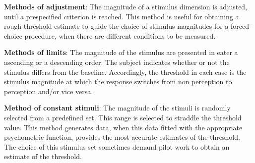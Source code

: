 \textbf{Methods of adjustment}: The magnitude of a stimulus dimension is adjusted, until a prespecified criterion is reached. This method is useful for obtaining a rough threshold estimate to guide the choice of stimulus magnitudes for a forced-choice procedure, when there are different conditions to be measured. \cite{Kingdom2016}

\textbf{Methods of limits}: The magnitude of the stimulus are presented in eater a ascending or a descending order.
The subject indicates whether or not the stimulus differs from the baseline. Accordingly, the threshold in each case is the stimulus magnitude at which the response switches from non perception to perception and/or vice versa. \cite{Kingdom2016}

\textbf{Method of constant stimuli}: The magnitude of the stimuli is randomly selected from a predefined set. This range is selected to straddle the threshold value. This method generates data, when this data fitted with the appropriate psychometric function, provides the most accurate estimates of the threshold. The choice of this stimulus set sometimes demand pilot work to obtain an estimate of the threshold. \cite{Kingdom2016}




